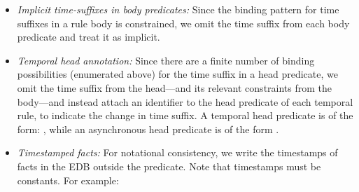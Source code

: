\begin{itemize}
%
%
\item {\em Implicit time-suffixes in body predicates:} Since the binding
pattern for time suffixes in a rule body is constrained, we omit the time
suffix from each body predicate and treat it as implicit.

\item {\em Temporal head annotation:} Since there are a finite number of
binding possibilities (enumerated above) for the time suffix in a head
predicate, we omit the time suffix from the head---and its relevant constraints
from the body---and instead attach an identifier to the head predicate of each
temporal rule, to indicate the change in time suffix.  A temporal  head
predicate  is of the form: , while
an asynchronous head predicate  is of the form
.

\item {\em Timestamped facts:} For notational consistency, we write the
timestamps of facts in the EDB outside the predicate.  Note that timestamps
must be constants.  For example:


%
%
%
%
%
\end{itemize}


